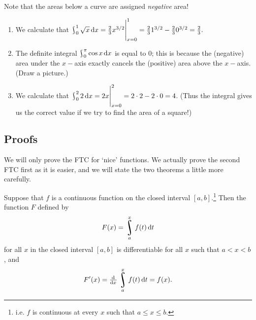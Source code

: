 Note that the areas below a curve are assigned \textit{negative} area!

\begin{exs}\leavevmode
  \begin{enumerate}
    \item We calculate that $ \rint^1_0 \sqrt{x} \dif{x}  = \eval{\frac{2}{3}x^{3/2}}_{x = 0}^1 = \frac{2}{3} 1^{3/2} - \frac{2}{3} 0^{3/2} = \frac{2}{3}. $
    \item The definite integral $ \rint^\pi_0 \cos x \dif{x} $ is equal to 0; this is because the (negative) area under the $ x-$axis exactly
          cancels the (positive) area above the $ x-$axis. (Draw a picture.)
    \item We calculate that $ \rint^2_0 2 \dif{x} = \eval{2x}_{x = 0}^2 = 2\cdot 2 - 2 \cdot 0 = 4 $. (Thus the integral gives us the correct value if we
          try to find the area of a square!)
  \end{enumerate}
\end{exs}


\clearpage
\subsection*{Proofs}
We will only prove the FTC for `nice' functions. We actually prove the second FTC first as it is easier, and we will state the two theorems a little
more carefully.

\begin{thm}[FTC2]
  Suppose that $ f $ is a continuous function on the closed interval $ [a,b] $.\footnote{i.e. $ f $ is continuous at every $ x $ such
  that $ a \leq x \leq b $.} Then the function $ F $ defined by
  \begin{displaymath}
    F(x) = \rint^x_a f(t) \dif{t}
  \end{displaymath}
  for all $ x $ in the closed interval $ [a,b] $ is differentiable for all $ x $ such that $ a < x < b $, and
  \begin{displaymath}
    F'(x) = \od{}{x} \rint^x_a f(t) \dif{t} = f(x).
  \end{displaymath}
\end{thm}

